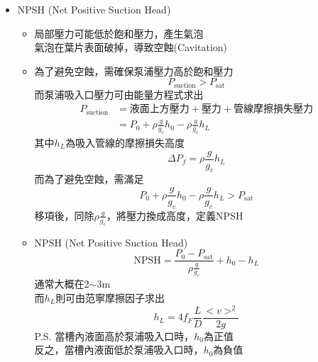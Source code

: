 \documentclass[../main.tex]{subfiles}
\begin{document}
\begin{itemize}
\begin{itemize}
\begin{itemize}
      \item BHP (Brake Horse Power)，實際馬力，制動馬力
      \begin{equation}
        \text{BHP} = \boxed{\text{HHP} \cdot \eta_{\text{turbine}}} = 
        W_s \cdot \dot m \cdot \eta_{\text{turbine}}
      \end{equation}
    \end{itemize}
  \end{itemize}
  \item NPSH (Net Positive Suction Head)
  \begin{itemize}
    \item 局部壓力可能低於飽和壓力，產生氣泡\\
    氣泡在葉片表面破掉，導致空蝕(Cavitation)
    \item 為了避免空蝕，需確保泵浦壓力高於飽和壓力
    \begin{equation}
      P_{\text{suction}} > P_{\text{sat}}
    \end{equation}
    而泵浦吸入口壓力可由能量方程式求出
    \begin{align}
      P_{\text{suction}} &= \text{液面上方壓力} + \text{壓力} + \text{管線摩擦損失壓力} \nonumber\\
      &=P_0 + \rho \frac{g}{g_c}h_{0} - \rho \frac{g}{g_c}\boxed{h_L}
    \end{align}
    其中$h_L$為吸入管線的摩擦損失高度
    \begin{equation}
      \Delta P_f = \rho \frac{g}{g_c} h_L
    \end{equation}
    而為了避免空蝕，需滿足
    \begin{equation}
      P_0 + \rho \frac{g}{g_c}h_{0} - \rho \frac{g}{g_c}h_L > P_{\text{sat}}
    \end{equation}
    移項後，同除$\rho \frac{g}{g_c}$，將壓力換成高度，定義NPSH
    \item NPSH (Net Positive Suction Head)
    \begin{equation}
      \boxed{\text{NPSH} = \frac{P_0 - P_{\text{sat}}}{\rho \frac{g}{g_c}} + h_0 - h_L}
    \end{equation}
    通常大概在2$\sim$3m\\
    而$h_L$則可由范寧摩擦因子求出
    \begin{equation}
      h_L = 4 f_F \frac{L}{D} \frac{<v>^2}{2g}
    \end{equation}
    P.S. 當槽內液面高於泵浦吸入口時，$\boxed{h_0}$為正值\\
    反之，當槽內液面低於泵浦吸入口時，$\boxed{h_0}$為負值\\

\end{itemize}
\end{itemize}
\end{document}
